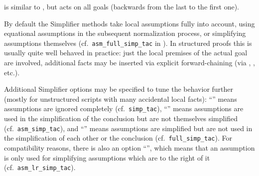 \begin{isabellebody}
\begin{isamarkuptext}
\begin{description}
  \item \hyperlink{method.simp-all}{\mbox{}} is similar to \hyperlink{method.simp}{\mbox{}}, but acts on
  all goals (backwards from the last to the first one).

  \end{description}

  By default the Simplifier methods take local assumptions fully into
  account, using equational assumptions in the subsequent
  normalization process, or simplifying assumptions themselves (cf.\
  \verb|asm_full_simp_tac| in \cite{isabelle-ref}).  In structured
  proofs this is usually quite well behaved in practice: just the
  local premises of the actual goal are involved, additional facts may
  be inserted via explicit forward-chaining (via \hyperlink{command.then}{\mbox{}},
  \hyperlink{command.from}{\mbox{\isa{\isacommand{from}}}}, \hyperlink{command.using}{\mbox{}} etc.).

  Additional Simplifier options may be specified to tune the behavior
  further (mostly for unstructured scripts with many accidental local
  facts): ``'' means assumptions are ignored
  completely (cf.\ \verb|simp_tac|), ``'' means
  assumptions are used in the simplification of the conclusion but are
  not themselves simplified (cf.\ \verb|asm_simp_tac|), and ``'' means assumptions are simplified but are not used
  in the simplification of each other or the conclusion (cf.\ \verb|full_simp_tac|).  For compatibility reasons, there is also an option
  ``'', which means that an assumption is only used
  for simplifying assumptions which are to the right of it (cf.\ \verb|asm_lr_simp_tac|).


\end{isamarkuptext}
\end{isabellebody}
